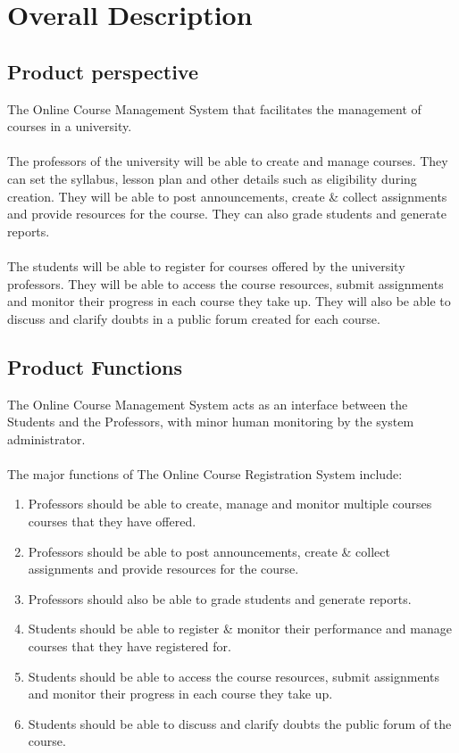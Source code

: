 \documentclass[12pt, a4]{report}
\begin{document}
\chapter{Overall Description}

\section{Product perspective}
The Online Course Management System that facilitates the management of courses in a university.
\\\\
The professors of the university will be able to create and manage courses. They can set the syllabus, lesson plan and other details such as eligibility during creation. They will be able to post announcements, create \& collect assignments and provide resources for the course. They can also grade students and generate reports.
\\\\
The students will be able to register for courses offered by the university professors. They will be able to access the course resources, submit assignments and monitor their progress in each course they take up. They will also be able to discuss and clarify doubts in a public forum created for each course.


\section{Product Functions}
The Online Course Management System acts as an interface between the Students and the Professors, with minor human monitoring by the system administrator.
\\\\
The major functions of The Online Course Registration System include:
\begin{enumerate}
    \item Professors should be able to create, manage and monitor multiple courses courses that they have offered.
    \item Professors should be able to post announcements, create \& collect assignments and provide resources for the course.
    \item Professors should also be able to grade students and generate reports.
    \item Students should be able to register \& monitor their performance and manage courses that they have registered for. 
    \item Students should be able to access the course resources, submit assignments and monitor their progress in each course they take up.
    \item Students should be able to discuss and clarify doubts the public forum of the course.
\end{enumerate}
\end{document}
